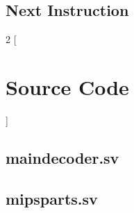 \documentclass[titlepage,12pt,oneside,a4paper]{article}
\begin{document}
\subsection{Next Instruction}

\newpage
\appendix
\begin{multicols}{2}
[	
\section{Source Code}
\label{appendix:src}
]
\subsection{maindecoder.sv}


\subsection{mipsparts.sv}
\label{appendix:src:mipsparts}

\end{multicols}
\end{document}
